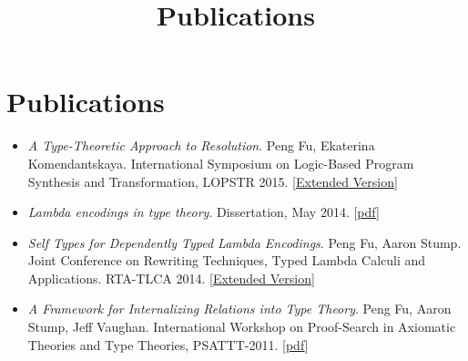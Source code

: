 \documentclass[10pt]{article}
\title{\bfseries\Large Publications}
\date{}
\begin{document}
\maketitle
\vspace{-4em}

\vspace{20pt}





\section*{Publications}

\begin{itemize}
\item \textit{A Type-Theoretic Approach to Resolution}. Peng Fu, Ekaterina Komendantskaya. International Symposium on Logic-Based Program Synthesis and Transformation, LOPSTR 2015. [\href{../../document/papers/tm-lp.pdf}{Extended Version}]

\item \textit{Lambda encodings in type theory}. Dissertation, May 2014. [\href{../../document/papers/dissertation.pdf}{pdf}]

\item \textit{Self Types for Dependently Typed Lambda Encodings}. Peng Fu, Aaron Stump. Joint Conference on Rewriting Techniques, Typed Lambda Calculi and Applications. RTA-TLCA 2014. [\href{../../document/papers/rta-tlca.pdf}{Extended Version}]

\item \textit{A Framework for Internalizing Relations into Type Theory}. Peng Fu, Aaron Stump, Jeff Vaughan. International Workshop on Proof-Search in Axiomatic Theories and Type Theories, PSATTT-2011. [\href{../../document/papers/psattt-paper.pdf}{pdf}]
  
\end{itemize}
\end{document}
